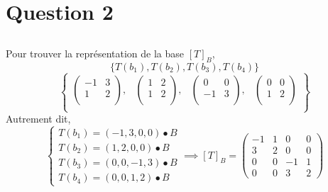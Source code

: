 \section*{Question 2}
\subsection{}
Pour trouver la représentation de la base $[T]_B$,
\[\{T(b_1),T(b_2),T(b_3),T(b_4)\}\]
\[
\begin{Bmatrix}
\left(
\begin{array}{cc}
-1 & 3 \\
1 & 2 \\
\end{array}
\right), & \left(
\begin{array}{cc}
1 & 2 \\
1 & 2 \\
\end{array}
\right), & \left(
\begin{array}{cc}
0 & 0 \\
-1 & 3 \\
\end{array}
\right), & \left(
\begin{array}{cc}
0 & 0 \\
1 & 2 \\
\end{array}
\right) \\
\end{Bmatrix}
\]
Autrement dit,
\[\begin{cases}
	T(b_1)=(-1,3,0,0)\bullet B\\
	T(b_2)=(1,2,0,0)\bullet B\\
	T(b_3)=(0,0,-1,3)\bullet B\\
	T(b_4)=(0,0,1,2)\bullet B
\end{cases}\implies [T]_B=
\begin{pmatrix}
 -1 & 1 & 0 & 0 \\
3 & 2 & 0 & 0 \\
0 & 0 & -1 & 1 \\
0 & 0 & 3 & 2
\end{pmatrix}
\]
